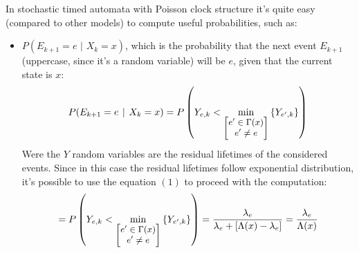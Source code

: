 \documentclass[12pt,a4paper]{article}
\begin{document}
\bigskip
\noindent
In stochastic timed automata with Poisson clock structure it's quite easy (compared to other models) to compute useful probabilities, such as:
\begin{itemize}
\item $P(E_{k+1}=e\hspace{4pt}|\hspace{4pt}X_k=x)$, which is the probability that the next event $E_{k+1}$ (uppercase, since it's a random variable) will be $e$, given that the current state is $x$:
$$
P(E_{k+1}=e\hspace{4pt}|\hspace{4pt}X_k=x)=P\left(Y_{e,k}< \min_{\small\left[
\begin{matrix}
e'\in \Gamma(x) \cr
e'\neq e
\end{matrix}\right]
}{\left\lbrace Y_{e',k}\right\rbrace }\right)
$$
Were the $Y$ random variables are the residual lifetimes of the considered events. Since in this case the residual lifetimes follow exponential distribution, it's possible to use the equation $(1)$ to proceed with the computation:
\begin{equation}
=P\left(Y_{e,k}< \min_{\small\left[
\begin{matrix}
e'\in \Gamma(x) \cr
e'\neq e
\end{matrix}\right]
}{\left\lbrace Y_{e',k}\right\rbrace }\right)
=\frac{\lambda_e}{\lambda_e+\left[\Lambda(x)-\lambda_e\right]}=\frac{\lambda_e}{\Lambda(x)}
\end{equation}


\end{itemize}
\end{document}
